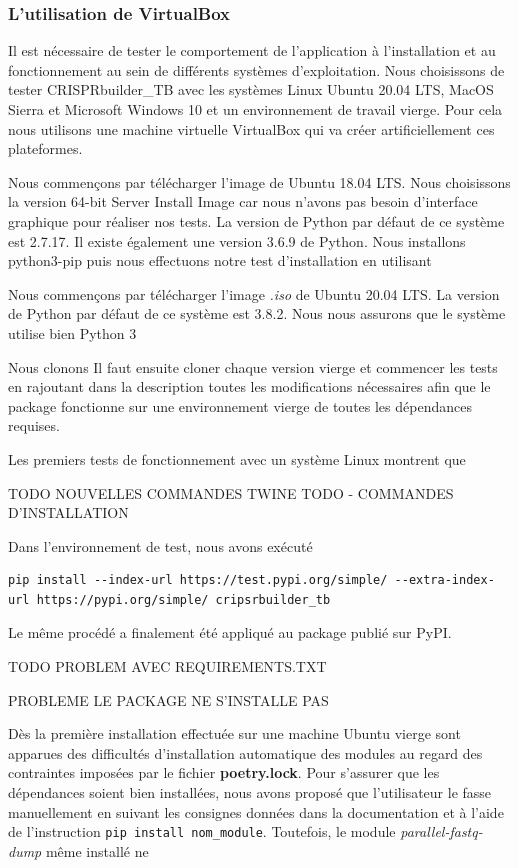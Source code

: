\documentclass[twoside,a4paper,11pt,frenchb,openany]{report}
\begin{document}
\subsubsection{L'utilisation de VirtualBox}

Il est nécessaire de tester le comportement de l'application à l'installation et au fonctionnement au sein de différents systèmes d'exploitation. Nous choisissons de tester CRISPRbuilder\_TB avec les systèmes Linux Ubuntu 20.04 LTS, MacOS Sierra et Microsoft Windows 10 et un environnement de travail vierge. Pour cela nous utilisons une machine virtuelle VirtualBox qui va créer artificiellement ces plateformes.

Nous commençons par télécharger l'image  de Ubuntu 18.04 LTS. Nous choisissons la version 64-bit Server Install Image car nous n'avons pas besoin d'interface graphique pour réaliser nos tests. La version de Python par défaut de ce système est 2.7.17. Il existe également une version 3.6.9 de Python. Nous installons python3-pip puis nous effectuons notre test d'installation en utilisant   

Nous commençons par télécharger l'image \textit{.iso} de Ubuntu 20.04 LTS. La version de Python par défaut de ce système est 3.8.2.
Nous nous assurons que le système utilise bien Python 3

Nous clonons Il faut ensuite cloner chaque version vierge et commencer les tests en rajoutant dans la description toutes les modifications nécessaires afin que le package fonctionne sur une environnement vierge de toutes les dépendances requises.

Les premiers tests de fonctionnement avec un système Linux montrent que


TODO NOUVELLES COMMANDES TWINE
TODO - COMMANDES D'INSTALLATION

Dans l'environnement de test, nous avons exécuté 

\begin{verbatim}
pip install --index-url https://test.pypi.org/simple/ --extra-index-url https://pypi.org/simple/ cripsrbuilder_tb
\end{verbatim}

Le même procédé a finalement été appliqué au package publié sur PyPI.


TODO PROBLEM AVEC REQUIREMENTS.TXT

PROBLEME LE PACKAGE NE S'INSTALLE PAS



Dès la première installation effectuée sur une machine Ubuntu vierge sont apparues des difficultés d'installation automatique des modules au regard des contraintes imposées par le fichier \textbf{poetry.lock}. Pour s'assurer que les dépendances soient bien installées, nous avons proposé que l'utilisateur le fasse manuellement en suivant les consignes données dans la documentation et à l'aide de l'instruction \texttt{pip install nom\_module}. Toutefois, le module \textit{parallel-fastq-dump} même installé ne 
\end{document}
